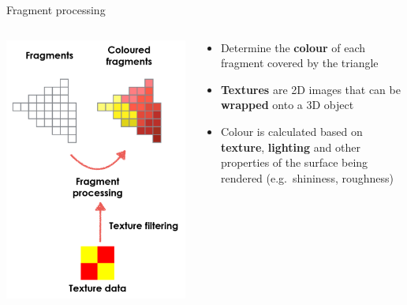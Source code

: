 \begin{frame}{Fragment processing}
	\begin{columns}
		\begin{column}{0.3\textwidth}
			\includegraphics[width=\textwidth]{pipeline_3}
		\end{column}
		\begin{column}{0.65\textwidth}
			\begin{itemize}
				\pause\item Determine the \textbf{colour} of each fragment covered by the triangle
				\pause\item \textbf{Textures} are 2D images that can be \textbf{wrapped} onto a 3D object
				\pause\item Colour is calculated based on \textbf{texture}, \textbf{lighting} and other
					properties of the surface being rendered (e.g.\ shininess, roughness)
			\end{itemize}
		\end{column}
	\end{columns}
\end{frame}

